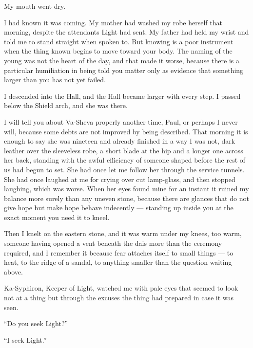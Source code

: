 My mouth went dry.\par

I had known it was coming. My mother had washed my robe herself that morning, despite the attendants Light had sent. My father had held my wrist and told me to stand straight when spoken to. But knowing is a poor instrument when the thing known begins to move toward your body. The naming of the young was not the heart of the day, and that made it worse, because there is a particular humiliation in being told you matter only as evidence that something larger than you has not yet failed.\par

I descended into the Hall, and the Hall became larger with every step. I passed below the Shield arch, and she was there.\par

I will tell you about Va-Sheva properly another time, Paul, or perhaps I never will, because some debts are not improved by being described. That morning it is enough to say she was nineteen and already finished in a way I was not, dark leather over the sleeveless robe, a short blade at the hip and a longer one across her back, standing with the awful efficiency of someone shaped before the rest of us had begun to set. She had once let me follow her through the service tunnels. She had once laughed at me for crying over cut lamp-glass, and then stopped laughing, which was worse. When her eyes found mine for an instant it ruined my balance more surely than any uneven stone, because there are glances that do not give hope but make hope behave indecently --- standing up inside you at the exact moment you need it to kneel.\par

Then I knelt on the eastern stone, and it was warm under my knees, too warm, someone having opened a vent beneath the dais more than the ceremony required, and I remember it because fear attaches itself to small things --- to heat, to the ridge of a sandal, to anything smaller than the question waiting above.\par

Ka-Syphiron, Keeper of Light, watched me with pale eyes that seemed to look not at a thing but through the excuses the thing had prepared in case it was seen.\par

``Do you seek Light?''\par

``I seek Light.''\par

